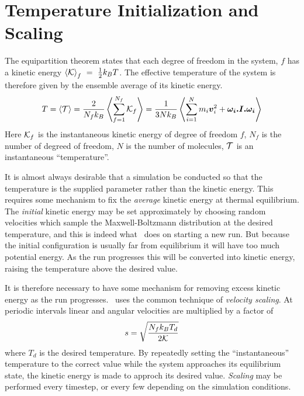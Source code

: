 \section{Temperature Initialization and Scaling}
\label{sec:rescaling}

The equipartition theorem states that each degree of freedom in the
system, $f$ has a kinetic energy $\left < {\cal K} \right >_f~=~\frac{1}{2}k_BT$.  The
effective temperature of the system is therefore given by the ensemble
average of its kinetic energy.
\begin{equation}
\label{eqn:equipartition}
T = \left < {\cal T} \right > = \frac{2}{N_fk_B}
\left < \sum_{f=1}^{N_f} {\cal K}_f \right > 
= \frac{1}{3Nk_B}\left < \sum_{i=1}^N  m_i \mbox{\boldmath \protect\(v\protect\)}_i^2 
+ \mbox{\boldmath \protect\( \omega_i.I. \omega_i\protect\)} \right > 
\end{equation}
Here ${\cal K}_f$ is the instantaneous kinetic energy of degree of
freedom $f$, $N_f$ is the number of degreed of freedom, $N$ is the
number of molecules, $\cal T$ is an instantaneous ``temperature''.

It is almost always desirable that a simulation be conducted so that
the temperature is the supplied parameter rather than the kinetic
energy.  This requires some mechanism to fix the {\em average} kinetic
energy at thermal equilibrium.   The {\em initial} kinetic energy may
be set approximately by choosing random velocities which sample the
Maxwell-Boltzmann distribution at the desired temperature, and this is
indeed what \moldy\ does on starting a new run.  But because the
initial configuration is usually far from equilibrium it will have too
much potential energy.  As the run progresses this will be converted
into kinetic energy, raising the temperature above the desired value.

It is therefore necessary to have some mechanism for removing excess
kinetic energy as the run progresses.  \moldy\ uses the common
technique of {\em velocity scaling}.  At periodic intervals linear and
angular velocities are multiplied by a factor of
\begin{equation}
\label{eqn:scaling}
s = \sqrt{\frac{N_fk_BT_d}{2\cal K}}
\end{equation}
where $T_d$ is the desired temperature.  By repeatedly setting the
``instantaneous'' temperature to the correct value while the system
approaches its equilibrium state, the kinetic energy is made to
approch its desired value.  {\em Scaling} may be performed every
timestep, or every few depending on the simulation conditions.

